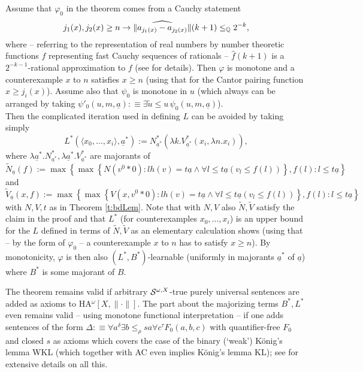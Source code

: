 \begin{rmk} \label{simple-L}
Assume that $\varphi_0$  in the theorem comes from a Cauchy statement 
\[ j_1(x),j_2(x)\ge n\to \widehat{\| 
a_{j_1(x)}-a_{j_2(x)}\|}(k+1)\le_{\mathbb{Q}} 
2^{-k}, \] where -- referring to the representation of real numbers 
by number theoretic functions $f$ representing fast Cauchy sequences of 
rationals -- $\widehat{f}(k+1)$ is a $2^{-k-1}$-rational approximation to $f$ 
(see \cite{Kohlenbach08} for details).  Then 
$\varphi$ is monotone and a counterexample $x$ to $n$ satisfies 
$x\ge n$ (using that for the Cantor pairing function $x\ge j_i(x)$). 
Assume also that $\psi_0$ is 
monotone in $u$ (which always can be arranged by taking 
$\psi'_0(u,m,\underline{a}):\equiv \exists \tilde{u}\le u\,\psi_0
(u,m,\underline{a})$). \\ 
Then the complicated iteration used in defining 
$L$ can be avoided by taking simply 
\[ L^*(\langle x_0,\ldots,x_i\rangle,\underline{a}^*):= 
N^*_{\underline{a}^*}(\lambda k.V^*_{\underline{a}^*}(x_i,
\lambda n.x_i)), \] 
where $\lambda \underline{a}^*.N^*_{\underline{a}^*},\lambda \underline{a}^*.
V^*_{\underline{a}^*}$ are majorants of 
\[ \tilde{N}_{\underline{a}}(f):=\max\left\{ \max\left\{ 
N(v^0*0):lh(v)=t\underline{a}\wedge \forall l\le t\underline{a}(v_l\le f(l))
\right\},f(l):l\le t\underline{a}\right\}\] and 
\[ \tilde{V}_{\underline{a}}(x,f):=\max\left\{ \max\left\{ 
V(x,v^0*0):lh(v)=t\underline{a}\wedge \forall l\le t\underline{a}(v_l\le f(l))
\right\},f(l):l\le t\underline{a}\right\}\] 
with $N,V,t$ as in Theorem \ref{t:bdLem}. Note that with $N,V$ also 
$\tilde{N},\tilde{V}$ satisfy the claim in the proof and that $L^*$ 
(for counterexamples $x_0,\ldots,x_i$) is 
an upper bound for the $L$ defined in terms of $\tilde{N},\tilde{V}$ as 
an elementary calculation shows (using that -- by the form of 
$\varphi_0$ -- a counterexample $x$ to $n$ has to satisfy $x\ge n$). 
By monotonicity, $\varphi$ is then also $(L^*,B^*)$-learnable (uniformly 
in majorants $\underline{a}^*$ of $\underline{a}$) where $B^*$ is some 
majorant of $B.$ 
\end{rmk}  
\begin{rmk} The theorem remains valid if arbitrary ${\cal S}^{\omega,X }$-true 
purely universal sentences are added as axioms to 
{\rm HA$^{\omega}[X,\|\cdot\|]$}. The part about the majorizing terms $B^*,L^*$ 
even remains valid -- using monotone functional interpretation -- 
if one adds sentences of the form $\Delta:\equiv 
\forall a^{\delta}\exists b\le_{\rho} sa\forall c^{\tau} 
F_0(a,b,c)$ with quantifier-free 
$F_0$ and closed $s$ as axioms which covers the case of the binary (`weak') K\"onig's lemma 
WKL (which together with AC even implies K\"onig's lemma KL); see 
\cite{Kohlenbach08} for extensive details on all this.
\end{rmk}
